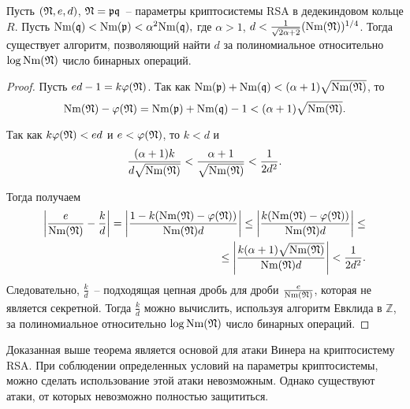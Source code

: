 \documentclass[_00_dissertation.tex]{subfiles}
\begin{document}
\begin{theorem}\label{theorem:Wiener}
    Пусть $(\mathfrak{N}, e, d)$, $\mathfrak{N} = \mathfrak{p} \mathfrak{q}$~-- параметры криптосистемы RSA в дедекиндовом кольце $R$.
    Пусть $\textrm{Nm}(\mathfrak{q}) < \textrm{Nm}(\mathfrak{p}) < \alpha^2 \textrm{Nm}(\mathfrak{q}),$ где $\alpha > 1$, $d<\frac{1}{\sqrt{2\alpha+2}}(\textrm{Nm}(\mathfrak{N}))^{1/4}$.
    Тогда существует алгоритм, позволяющий найти $d$ за полиномиальное относительно $\log \textrm{Nm}(\mathfrak{N})$ число бинарных операций.
\end{theorem}
\begin{proof}
    Пусть $ed - 1 = k \varphi(\mathfrak{N})$.
    Так как $\textrm{Nm}(\mathfrak{p}) + \textrm{Nm}(\mathfrak{q}) < (\alpha + 1)\sqrt{\textrm{Nm}(\mathfrak{N})}$, то
    \begin{equation*}
        \textrm{Nm}(\mathfrak{N}) - \varphi(\mathfrak{N}) = \textrm{Nm}(\mathfrak{p}) + \textrm{Nm}(\mathfrak{q}) - 1 < (\alpha + 1)\sqrt{\textrm{Nm}(\mathfrak{N})}.
    \end{equation*}
    
    Так как $k \varphi(\mathfrak{N}) < ed$ и $e < \varphi(\mathfrak{N})$, то $k < d$ и
    \begin{equation*}
        \frac{(\alpha + 1)k}{d\sqrt{\textrm{Nm}(\mathfrak{N})}} < \frac{\alpha + 1}{\sqrt{\textrm{Nm}(\mathfrak{N})}} < \frac{1}{2 d^2}.
    \end{equation*}
    
    Тогда получаем
    \begin{equation*}
        \begin{split}
            \left|
                \frac{e}{\textrm{Nm}(\mathfrak{N})} - \frac{k}{d}
            \right| = \left|
                \frac{1 - k(\textrm{Nm}(\mathfrak{N}) - \varphi(\mathfrak{N}))}{\textrm{Nm}(\mathfrak{N})d}
            \right| \le \left|
                \frac{k(\textrm{Nm}(\mathfrak{N}) - \varphi(\mathfrak{N}))}{\textrm{Nm}(\mathfrak{N})d}
            \right| \le \\
            \le \left|
                \frac{k(\alpha + 1)\sqrt{\textrm{Nm}(\mathfrak{N})}}{\textrm{Nm}(\mathfrak{N})d}
            \right| < \frac{1}{2 d^2}.
        \end{split}
    \end{equation*}
    Следовательно, $\frac{k}{d}$~-- подходящая цепная дробь для дроби $\frac{e}{\textrm{Nm}(\mathfrak{N})}$, которая не является секретной.
    Тогда $\frac{k}{d}$ можно вычислить, используя алгоритм Евклида в $\mathbb{Z}$, за полиномиальное относительно $\log \textrm{Nm}(\mathfrak{N})$ число бинарных операций.
\end{proof}

Доказанная выше теорема является основой для атаки Винера на криптосистему RSA.
При соблюдении определенных условий на параметры криптосистемы, можно сделать использование этой атаки невозможным.
Однако существуют атаки, от которых невозможно полностью защититься.
\end{document}

